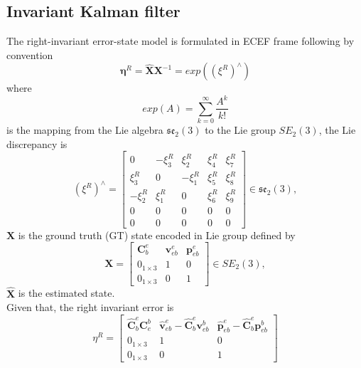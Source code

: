 \documentclass[conference]{IEEEtran}
\begin{document}
\subsection{Invariant Kalman filter}
The right-invariant error-state model is formulated in ECEF frame following \cite{barrau2018invariant} \cite{luo2021se2} by convention
\begin{equation}
  \label{RI-ikf_err}
\mathbf{\eta}^{R}=\hat{\mathbf X}\mathbf X^{-1} = exp((\xi^R)^\wedge) 
\end{equation}
where 
\begin{equation}
  \label{expm}
  exp(A)
= \sum_{k=0}^{\infty} \frac{A^k}{k!}
\end{equation} is the mapping from the Lie algebra \(\mathfrak{se}_2(3)\) to the Lie group \(SE_2(3)\), the Lie discrepancy is
\begin{equation}
  \label{vec2lie}
  (\xi^R)^\wedge
=
\begin{bmatrix}
0        & -\xi_3^R & \xi_2^R  & \xi_4^R & \xi_7^R \\
\xi_3^R  & 0        & -\xi_1^R & \xi_5^R & \xi_8^R \\
-\xi_2^R & \xi_1^R  & 0        & \xi_6^R & \xi_9^R \\
0        & 0        & 0        & 0        & 0       \\
0        & 0        & 0        & 0        & 0
\end{bmatrix}
\in \mathfrak{se}_2(3),
\end{equation}
\(\mathbf{X}\) is the ground truth  (GT) state encoded in Lie group defined by
\begin{equation}
  \label{state_embbed}
\mathbf X = \begin{bmatrix}
\mathbf{C}_{b}^{e} & \boldsymbol{v}_{eb}^{e} & \boldsymbol{p}_{eb}^{e} \\
0_{1\times 3} & 1 & 0 \\
0_{1\times 3} & 0 & 1
\end{bmatrix} \in SE_2(3),
\end{equation}
\(\mathbf{\hat{X}}\) is the estimated state.  \\ 
Given that, the right invariant error is 
\begin{equation}
\eta^{R}
=
\begin{bmatrix}
\hat{\mathbf{C}}_{b}^{e}\mathbf{C}_{e}^{b}
&
\hat{\boldsymbol{v}}_{eb}^{e}-\hat{\mathbf{C}}_{b}^{e}\boldsymbol{v}_{eb}^{b}
&
\hat{\boldsymbol{p}}_{eb}^{e}-\hat{\mathbf{C}}_{b}^{e}\boldsymbol{p}_{eb}^{b}
\\
0_{1\times 3} & 1 & 0 \\
0_{1\times 3} & 0 & 1
\end{bmatrix}
\end{equation}
\end{document}
